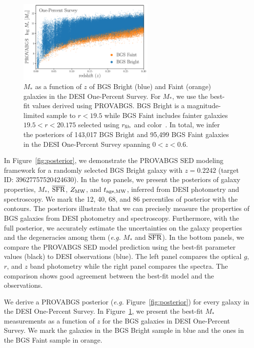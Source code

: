 \begin{figure}
\begin{center}
    \includegraphics[width=0.6\textwidth]{figs/mstar_z.pdf}
    \caption{
        $M_*$ as a function of $z$ of BGS Bright (blue) and Faint (orange)
        galaxies in the DESI One-Percent Survey. 
        For $M_*$, we use the best-fit values derived using PROVABGS. 
        BGS Bright is a magnitude-limited sample to $r < 19.5$ while BGS Faint
        includes fainter galaxies $19.5 < r < 20.175$ selected using $r_{\rm
        fib}$ and color~\citep{hahn2022a}. 
        In total, we infer the posteriors of 143,017 BGS Bright and 95,499 BGS
        Faint galaxies in the DESI One-Percent Survey spanning $0 < z < 0.6$. 
    }\label{fig:mstar_z}
\end{center}
\end{figure}


In Figure~\ref{fig:posterior}, we demonstrate the PROVABGS SED modeling
framework for a randomly selected BGS Bright galaxy with $z=0.2242$ 
(target ID: 39627757520424630).
In the top panels, we present the posteriors of galaxy properties, $M_*$, 
$\overline{\rm SFR}$, $Z_{\rm MW}$, and $t_{\rm age, MW}$, inferred from DESI
photometry and spectroscopy. 
We mark the 12, 40, 68, and 86 percentiles of posterior with the contours. 
The posteriors illustrate that we can precisely measure the properties of BGS
galaxies from DESI photometry and spectroscopy. 
Furthermore, with the full posterior, we accurately estimate the uncertainties
on the galaxy properties and the degeneracies among them (\emph{e.g.} $M_*$ and
$\overline{\rm SFR}$). 
In the bottom panels, we compare the PROVABGS SED model prediction using the
best-fit parameter values (black) to DESI observations (blue). 
The left panel compares the optical $g$, $r$, and $z$ band photometry while the
right panel compares the spectra. 
The comparison shows good agreement between the best-fit model and the
observations. 

We derive a PROVABGS posterior (\emph{e.g.} Figure~\ref{fig:posterior}) for
every galaxy in the DESI One-Percent Survey. 
In Figure~\ref{fig:mstar_z}, we present the best-fit $M_*$ measurements as a
function of $z$ for the BGS galaxies in DESI One-Percent Survey. 
We mark the galaxies in the BGS Bright sample in blue and the ones in the BGS
Faint sample in orange. 
